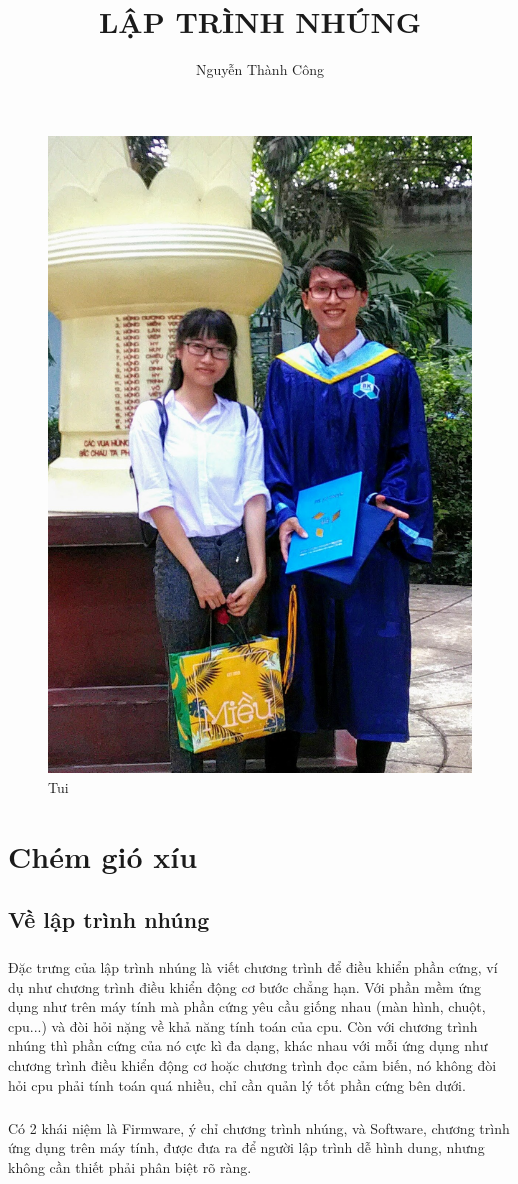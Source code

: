 \documentclass[12pt,a5paper]{book}
\title{LẬP TRÌNH NHÚNG}
\author{Nguyễn Thành Công}
\begin{document}
\maketitle
\begin{figure}
\centering
 \includegraphics[width=0.5\linewidth]{tao.jpg}
 \caption{Tui}
\end{figure}
\tableofcontents{}
 \chapter{Chém gió xíu }
	\section{Về lập trình nhúng}
		\paragraph{}
Đặc trưng của lập trình nhúng là viết chương trình để điều khiển phần cứng, ví dụ như chương trình điều khiển động cơ bước chẳng hạn. Với phần mềm ứng dụng như trên máy tính mà phần cứng yêu cầu giống nhau (màn hình, chuột, cpu...) và đòi hỏi nặng về khả năng tính toán của cpu. Còn với chương trình nhúng thì phần cứng của nó cực kì đa dạng, khác nhau với mỗi ứng dụng như chương trình điều khiển động cơ hoặc chương trình đọc cảm biến, nó không đòi hỏi cpu phải tính toán quá nhiều, chỉ cần quản lý tốt phần cứng bên dưới. 
		\paragraph{}
Có 2 khái niệm là Firmware, ý chỉ chương trình nhúng, và Software, chương trình ứng dụng trên máy tính, được đưa ra để người lập trình dễ hình dung, nhưng không cần thiết phải phân biệt rõ ràng.
\end{document}
